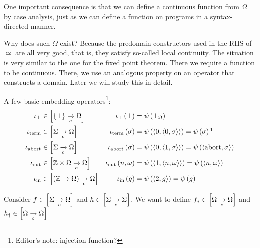 \begin{enumcirc}
\begin{enumrm}
		One important consequence is that we can define a continuous function from
		$\Omega$ by case analysis, just as we can define a function on programs in a
		syntax-directed manner.
		\item
		Why does such $\Omega$ exist?
		Because the predomain constructors used in the RHS of $\simeq$ are all very
		good, that is, they satisfy so-called local continuity.
		The situation is very similar to the one for the fixed point theorem.
		There we require a function to be continuous.
		There, we use an analogous property on an operator that constructs a domain.
		Later we will study this in detail.
		\item
		A few basic embedding operators\footnote{Editor's note: injection function?}:
		\begin{align*}
			\ibot                                            &
			\in \brackets{\braces{\bot} \toc \Omega}         &
			\ibot\prths{\bot} =\;                            &
			\psi\prths{\bot_\Omega}                                                               \\
			\iterm                                           &
			\in \brackets{\Sigma \toc \Omega}                &
			\iterm\prths{\sigma} =\;                         &
			\psi\prths{\chevrons{0,\chevrons{0, \sigma}}} = \psi\prths{\sigma}\footnotemark       \\
			\iabort                                          &
			\in \brackets{\Sigma \toc \Omega}                &
			\iabort\prths{\sigma} =\;                        &
			\psi\prths{\chevrons{0,\chevrons{1, \sigma}}} = \psi\prths{\chevrons{\abort, \sigma}} \\
			\iout                                            &
			\in \brackets{\Z \times \Omega \toc \Omega}      &
			\iout\prths{n, \omega} =\;                       &
			\psi\prths{\chevrons{1, \chevrons{n, \omega}}} = \psi\prths{\chevrons{n, \omega}}     \\
			\iin                                             &
			\in \brackets{\prths{\Z \to \Omega} \toc \Omega} &
			\iin\prths{g} =\;                                &
			\psi\prths{\chevrons{2, g}} = \psi\prths{g}
		\end{align*}
		\item
		Consider $f \in \left[ \Sigma \xrightarrow[c]{} \Omega \right]$
		and $h \in \left[ \Sigma \xrightarrow[c]{} \Sigma \right]$.
		We want to define $f_* \in \left[ \Omega \xrightarrow[c]{} \Omega \right]$
		and $h_\dagger \in \left[ \Omega \xrightarrow[c]{} \Omega \right]$

\end{enumrm}
\end{enumcirc}
